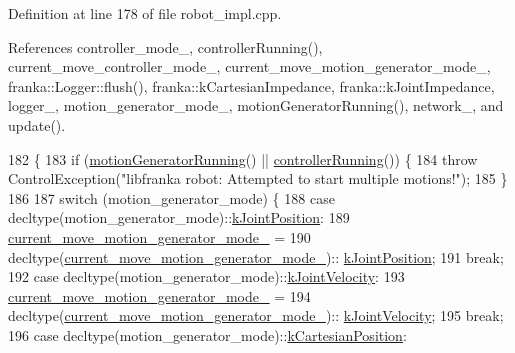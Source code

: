 Definition at line 178 of file robot\+\_\+impl.\+cpp.



References controller\+\_\+mode\+\_\+, controller\+Running(), current\+\_\+move\+\_\+controller\+\_\+mode\+\_\+, current\+\_\+move\+\_\+motion\+\_\+generator\+\_\+mode\+\_\+, franka\+::\+Logger\+::flush(), franka\+::k\+Cartesian\+Impedance, franka\+::k\+Joint\+Impedance, logger\+\_\+, motion\+\_\+generator\+\_\+mode\+\_\+, motion\+Generator\+Running(), network\+\_\+, and update().


\begin{DoxyCode}
182                                                                              \{
183   \textcolor{keywordflow}{if} (\hyperlink{classfranka_1_1Robot_1_1Impl_aa6b34693c27b529a52f7ea5a607c7252}{motionGeneratorRunning}() || \hyperlink{classfranka_1_1Robot_1_1Impl_ac2d91fb2b9838536bcea8ab1aae4802e}{controllerRunning}()) \{
184     \textcolor{keywordflow}{throw} ControlException(\textcolor{stringliteral}{"libfranka robot: Attempted to start multiple motions!"});
185   \}
186 
187   \textcolor{keywordflow}{switch} (motion\_generator\_mode) \{
188     \textcolor{keywordflow}{case} decltype(motion\_generator\_mode)::\hyperlink{namespaceresearch__interface_1_1robot_abd2451eb963a1843f1eb066ebd4b06e8a3a31dc92434874cc44c61e876b8bd35f}{kJointPosition}:
189       \hyperlink{classfranka_1_1Robot_1_1Impl_a2fecb29212c55738e284b2ba8249ad5c}{current\_move\_motion\_generator\_mode\_} =
190           decltype(\hyperlink{classfranka_1_1Robot_1_1Impl_a2fecb29212c55738e284b2ba8249ad5c}{current\_move\_motion\_generator\_mode\_})::
      \hyperlink{namespaceresearch__interface_1_1robot_abd2451eb963a1843f1eb066ebd4b06e8a3a31dc92434874cc44c61e876b8bd35f}{kJointPosition};
191       \textcolor{keywordflow}{break};
192     \textcolor{keywordflow}{case} decltype(motion\_generator\_mode)::\hyperlink{namespaceresearch__interface_1_1robot_abd2451eb963a1843f1eb066ebd4b06e8a729c7783e4ea7890b50022b1194e89d6}{kJointVelocity}:
193       \hyperlink{classfranka_1_1Robot_1_1Impl_a2fecb29212c55738e284b2ba8249ad5c}{current\_move\_motion\_generator\_mode\_} =
194           decltype(\hyperlink{classfranka_1_1Robot_1_1Impl_a2fecb29212c55738e284b2ba8249ad5c}{current\_move\_motion\_generator\_mode\_})::
      \hyperlink{namespaceresearch__interface_1_1robot_abd2451eb963a1843f1eb066ebd4b06e8a729c7783e4ea7890b50022b1194e89d6}{kJointVelocity};
195       \textcolor{keywordflow}{break};
196     \textcolor{keywordflow}{case} decltype(motion\_generator\_mode)::\hyperlink{namespaceresearch__interface_1_1robot_abd2451eb963a1843f1eb066ebd4b06e8ad05aa68e21654f0d7f3672e6827366b6}{kCartesianPosition}:

\end{DoxyCode}

